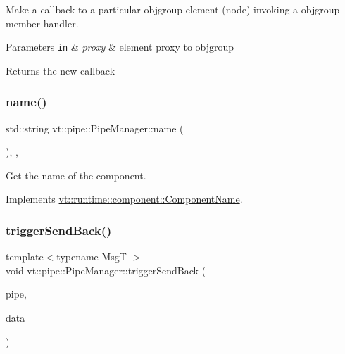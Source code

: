 Make a callback to a particular objgroup element (node) invoking a objgroup member handler. 


\begin{DoxyParams}[1]{Parameters}
\mbox{\tt in}  & {\em proxy} & element proxy to objgroup\\
\hline
\end{DoxyParams}
\begin{DoxyReturn}{Returns}
the new callback 
\end{DoxyReturn}
\mbox{\label{structvt_1_1pipe_1_1_pipe_manager_aad60c922d604dd1b9ff47e428d265eed}} 
\subsubsection{\texorpdfstring{name()}{name()}}
{\footnotesize\ttfamily std\+::string vt\+::pipe\+::\+Pipe\+Manager\+::name (\begin{DoxyParamCaption}{ }\end{DoxyParamCaption})\hspace{0.3cm}{\ttfamily [inline]}, {\ttfamily [override]}, {\ttfamily [virtual]}}



Get the name of the component. 



Implements \hyperlink{structvt_1_1runtime_1_1component_1_1_component_name_a33c06229bb605a2b2ceff68830d6d773}{vt\+::runtime\+::component\+::\+Component\+Name}.

\mbox{\label{structvt_1_1pipe_1_1_pipe_manager_aaddd05d4eec8fbcbe8134f9c907a7306}} 
\subsubsection{\texorpdfstring{trigger\+Send\+Back()}{triggerSendBack()}}
{\footnotesize\ttfamily template$<$typename MsgT $>$ \\
void vt\+::pipe\+::\+Pipe\+Manager\+::trigger\+Send\+Back (\begin{DoxyParamCaption}\item[{\hyperlink{namespacevt_ac9852acda74d1896f48f406cd72c7bd3}{Pipe\+Type} const \&}]{pipe,  }\item[{MsgT $\ast$}]{data }\end{DoxyParamCaption})}




